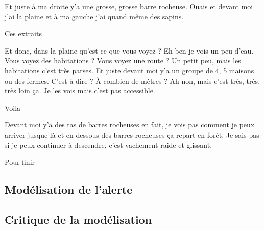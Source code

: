 \begin{dialogue*}
  \Req {} Et juste à ma droite y’a une grosse, grosse
  barre rocheuse.  Ouais et devant moi j’ai la plaine
  et  à ma gauche j’ai quand même des sapins.
\end{dialogue*}
% 
Ces extraits


\begin{dialogue*}
  \Sec {} Et donc, dans la plaine qu’est-ce que vous
  voyez ?
  \Req {} Eh ben je vois un peu d’eau.
  \Sec {} Vous voyez des habitations ? Vous voyez une
  route ?
  \Req {} Un petit peu, mais les habitations c’est très
  parses.  Et juste devant moi y’a un groupe de 4, 5
  maisons ou des fermes.
  \Sec {} C’est-à-dire ? À combien de mètres ?
  \Req {} Ah non, mais c’est très, très, très loin
  ça. Je les vois mais c’est pas accessible.
\end{dialogue*}
% 
Voila


\begin{dialogue*}
  \Req {} Devant moi y’a des tas de barres rocheuses en
  fait, je vois pas comment je peux arriver jusque-là et
   en dessous des barres rocheuses ça repart en
  forêt.  Je sais pas si je peux continuer à
  descendre, c’est vachement raide et glissant.
\end{dialogue*}
% 
Pour finir

\subsection{Modélisation de l'alerte}
\label{subsec:9-3-2}


\subsection{Critique de la modélisation}
\label{subsec:9-3-3}



